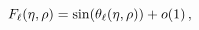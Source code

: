 \[\mathop{F_{\ell}\/}\nolimits\!\left(\eta,\rho\right)=\mathop{\sin\/}\nolimits%
\!\left(\mathop{{\theta_{\ell}}\/}\nolimits\!\left(\eta,\rho\right)\right)+%
\mathop{o\/}\nolimits\!\left(1\right),\]